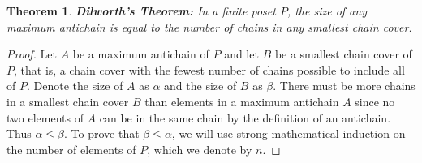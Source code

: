 \documentclass{article} %
\theoremstyle{definition}
\theoremstyle{plain}
\newtheorem{thm}{Theorem}[section]
\begin{document}
\begin{thm} \textbf{Dilworth's Theorem:} In a finite poset $P$, the size of any maximum antichain is equal to the number of chains in any smallest chain cover. 
\end{thm}
\begin{proof}
Let $A$ be a maximum antichain of $P$ and let $B$ be a smallest chain cover of $P$, that is, a chain cover with the fewest number of chains possible to include all of $P$. Denote the size of $A$ as $\alpha$ and the size of $B$ as $\beta$. There must be more chains in a smallest chain cover $B$ than elements in a maximum antichain $A$ since no two elements of $A$ can be in the same chain by the definition of an antichain. Thus $\alpha \leq \beta$.
To prove that $\beta \leq \alpha$, we will use strong mathematical induction on the number of elements of $P$, which we denote by $n$.


\end{proof}
\end{document}
